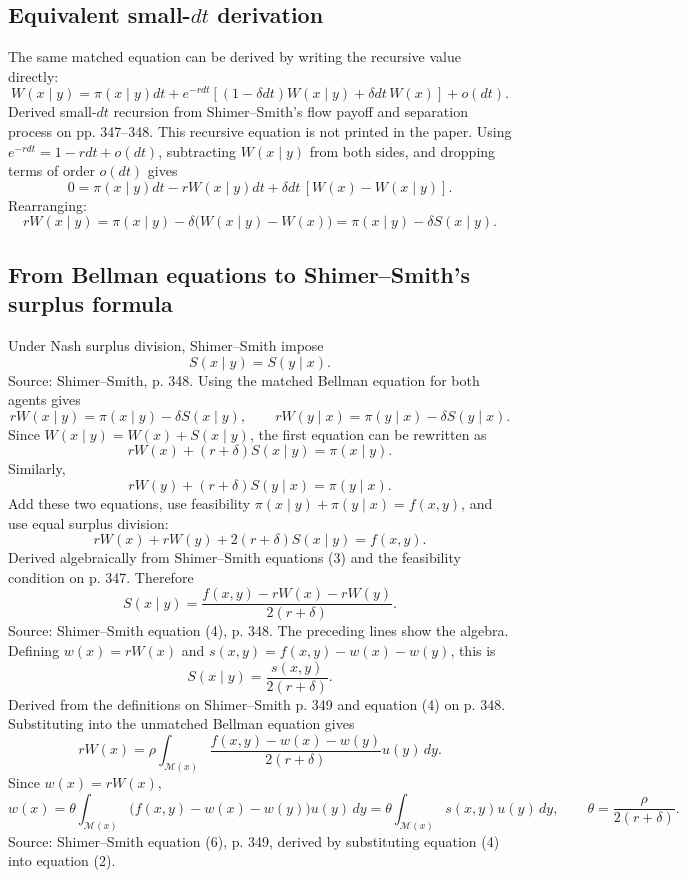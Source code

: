 \documentclass[11pt]{article}
\newcommand{\M}{\mathcal{M}}
\begin{document}
\subsection{Equivalent small-\texorpdfstring{$dt$}{dt} derivation}

The same matched equation can be derived by writing the recursive value directly:
\[
W(x\mid y)
=\pi(x\mid y)dt
 + e^{-rdt}\left[(1-\delta dt)W(x\mid y)+\delta dt\,W(x)\right]
 + o(dt).
\]
Derived small-$dt$ recursion from Shimer--Smith's flow payoff and separation
process on pp. 347--348. This recursive equation is not printed in the paper.
Using $e^{-rdt}=1-rdt+o(dt)$, subtracting $W(x\mid y)$ from both sides, and
dropping terms of order $o(dt)$ gives
\[
0=\pi(x\mid y)dt-rW(x\mid y)dt+\delta dt\,[W(x)-W(x\mid y)].
\]
Rearranging:
\[
rW(x\mid y)=\pi(x\mid y)-\delta\bigl(W(x\mid y)-W(x)\bigr)
=\pi(x\mid y)-\delta S(x\mid y).
\]

\subsection{From Bellman equations to Shimer--Smith's surplus formula}

Under Nash surplus division, Shimer--Smith impose
\[
S(x\mid y)=S(y\mid x).
\]
Source: Shimer--Smith, p. 348.
Using the matched Bellman equation for both agents gives
\[
rW(x\mid y)=\pi(x\mid y)-\delta S(x\mid y),
\qquad
rW(y\mid x)=\pi(y\mid x)-\delta S(y\mid x).
\]
Since $W(x\mid y)=W(x)+S(x\mid y)$, the first equation can be rewritten as
\[
rW(x)+(r+\delta)S(x\mid y)=\pi(x\mid y).
\]
Similarly,
\[
rW(y)+(r+\delta)S(y\mid x)=\pi(y\mid x).
\]
Add these two equations, use feasibility
$\pi(x\mid y)+\pi(y\mid x)=f(x,y)$, and use equal surplus division:
\[
rW(x)+rW(y)+2(r+\delta)S(x\mid y)=f(x,y).
\]
Derived algebraically from Shimer--Smith equations (3) and the feasibility
condition on p. 347.
Therefore
\begin{equation}
S(x\mid y)
=\frac{f(x,y)-rW(x)-rW(y)}{2(r+\delta)}.
\tag{SS-4}
\end{equation}
Source: Shimer--Smith equation (4), p. 348. The preceding lines show the
algebra.
Defining $w(x)=rW(x)$ and $s(x,y)=f(x,y)-w(x)-w(y)$, this is
\[
S(x\mid y)=\frac{s(x,y)}{2(r+\delta)}.
\]
Derived from the definitions on Shimer--Smith p. 349 and equation (4) on
p. 348.
Substituting into the unmatched Bellman equation gives
\[
rW(x)
=\rho\int_{\M(x)}
\frac{f(x,y)-w(x)-w(y)}{2(r+\delta)}u(y)\,dy.
\]
Since $w(x)=rW(x)$,
\begin{equation}
w(x)
=\theta\int_{\M(x)}
\bigl(f(x,y)-w(x)-w(y)\bigr)u(y)\,dy
=\theta\int_{\M(x)}s(x,y)u(y)\,dy,
\qquad
\theta=\frac{\rho}{2(r+\delta)}.
\tag{SS-6}
\end{equation}
Source: Shimer--Smith equation (6), p. 349, derived by substituting equation
(4) into equation (2).
\end{document}
